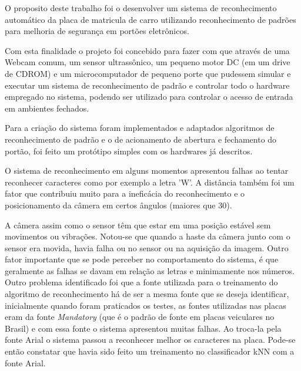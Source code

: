 
O proposito deste trabalho foi o desenvolver um sistema de reconhecimento automático da placa de matricula de carro utilizando reconhecimento de padrões para melhoria de segurança em portões eletrônicos.

Com esta finalidade o projeto foi concebido para fazer com que através de uma Webcam comum, um sensor ultrassônico, um pequeno motor DC (em um drive de CDROM) e um microcomputador de pequeno porte que pudessem simular e executar um sistema de reconhecimento de padrão e controlar todo o hardware empregado no sistema, podendo ser utilizado para controlar o acesso de entrada em ambientes fechados.

Para a criação do sistema foram implementados e adaptados algoritmos de reconhecimento de padrão e o de acionamento de abertura e fechamento do portão, foi feito um protótipo simples com os hardwares já descritos.

O sistema de reconhecimento em alguns momentos apresentou falhas ao tentar reconhecer caracteres como por exemplo a letra 'W'. A distância também foi um fator que contribuiu muito para a ineficácia do reconhecimento e o posicionamento da câmera em certos ângulos (maiores que 30\textdegree).
 
A câmera assim como o sensor têm que estar em uma posição estável sem movimentos ou vibrações. Notou-se que quando a haste da câmera junto com o sensor era movida, havia falha ou no sensor ou na aquisição da imagem. Outro fator importante que se pode perceber no comportamento do sistema, é que geralmente as falhas se davam em relação as letras e minimamente nos números. Outro problema identificado foi que a fonte utilizada para o treinamento do algoritmo de reconhecimento há de ser a mesma fonte que se deseja identificar, inicialmente quando foram praticados os testes, as fontes utilizadas nas placas eram da fonte \emph{Mandatory} (que é o padrão de fonte em placas veiculares no Brasil) e com essa fonte o sistema apresentou muitas falhas. Ao troca-la pela fonte Arial o sistema passou a reconhecer melhor os caracteres na placa. 	Pode-se então constatar que havia sido feito um treinamento no classificador kNN com a fonte Arial.

